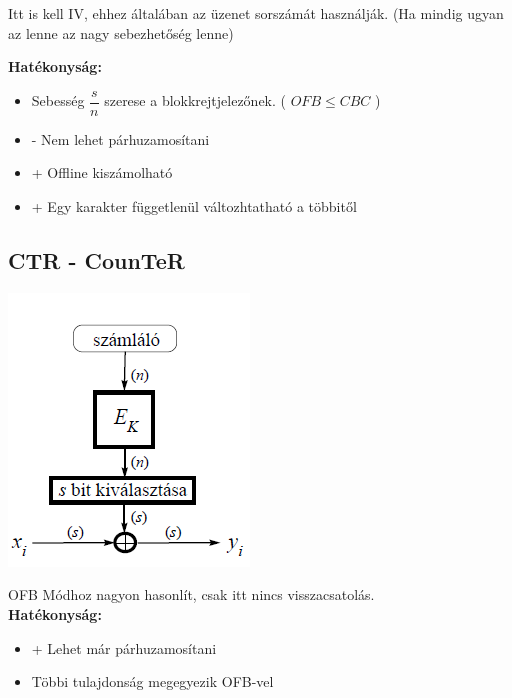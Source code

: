 Itt is kell IV, ehhez általában az üzenet sorszámát használják. (Ha mindig ugyan az lenne az nagy sebezhetőség lenne)

\textbf{Hatékonyság:}
	\begin{itemize}
		\item Sebesség $\dfrac{s}{n}$ szerese a blokkrejtjelezőnek. ( $OFB \leq CBC $ )
		\item - Nem lehet párhuzamosítani
		\item + Offline kiszámolható
		\item + Egy karakter függetlenül változhtatható a többitől
	\end{itemize}

\subsection{CTR - CounTeR}

\begin{center}
	\includegraphics[scale=0.7]{img/CTR}
\end{center}

OFB Módhoz nagyon hasonlít, csak itt nincs visszacsatolás.\\[-2pt]

\textbf{Hatékonyság:}
	\begin{itemize}
		\item + Lehet már párhuzamosítani
		\item Többi tulajdonság megegyezik OFB-vel
	\end{itemize}
